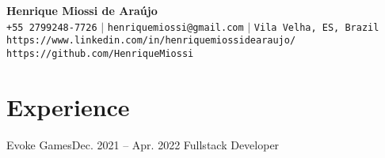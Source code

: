 \begin{center}
    \textbf{\Huge Henrique Miossi de Araújo} \\ \vspace{5pt}
    \small \faPhone* \texttt{+55 2799248-7726} \hspace{1pt} $|$
    \hspace{1pt} \faEnvelope \hspace{2pt} \texttt{henriquemiossi@gmail.com} \hspace{1pt} $|$ 
    \hspace{1pt} \faMapMarker* \hspace{2pt}\texttt{Vila Velha, ES, Brazil}
    \\ \hspace{1pt} \faLinkedin \hspace{2pt} \texttt{https://www.linkedin.com/in/henriquemiossidearaujo/}
    \\ \hspace{1pt} \faGithub \hspace{2pt} \texttt{https://github.com/HenriqueMiossi}
    \\ \vspace{-3pt}
\end{center}

\section{Experience}
  \resumeSubHeadingListStart


      
    \resumeSubheading
      {Evoke Games}{Dec. 2021 -- Apr. 2022}
      {Fullstack Developer}{}
      \resumeItemListStart
      \resumeItemListEnd
      
